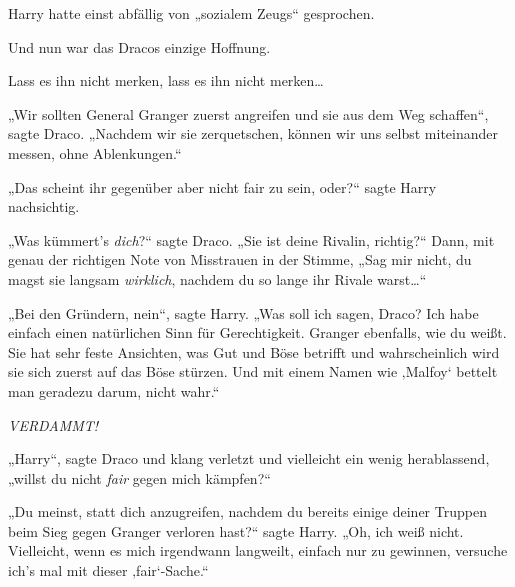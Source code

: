 Harry hatte einst abfällig von „sozialem Zeugs“ gesprochen.

Und nun war das Dracos einzige Hoffnung.

Lass es ihn nicht merken, lass es ihn nicht merken…

„Wir sollten General Granger zuerst angreifen und sie aus dem Weg schaffen“, sagte Draco. „Nachdem wir sie zerquetschen, können wir uns selbst miteinander messen, ohne Ablenkungen.“

„Das scheint ihr gegenüber aber nicht fair zu sein, oder?“ sagte Harry nachsichtig.

„Was kümmert’s \emph{dich}?“ sagte Draco. „Sie ist deine Rivalin, richtig?“ Dann, mit genau der richtigen Note von Misstrauen in der Stimme, „Sag mir nicht, du magst sie langsam \emph{wirklich}, nachdem du so lange ihr Rivale warst…“

„Bei den Gründern, nein“, sagte Harry. „Was soll ich sagen, Draco? Ich habe einfach einen natürlichen Sinn für Gerechtigkeit. Granger ebenfalls, wie du weißt. Sie hat sehr feste Ansichten, was Gut und Böse betrifft und wahrscheinlich wird sie sich zuerst auf das Böse stürzen. Und mit einem Namen wie ‚Malfoy‘ bettelt man geradezu darum, nicht wahr.“

\emph{VERDAMMT!}

„Harry“, sagte Draco und klang verletzt und vielleicht ein wenig herablassend, „willst du nicht \emph{fair} gegen mich kämpfen?“

„Du meinst, statt dich anzugreifen, nachdem du bereits einige deiner Truppen beim Sieg gegen Granger verloren hast?“ sagte Harry. „Oh, ich weiß nicht. Vielleicht, wenn es mich irgendwann langweilt, einfach nur zu gewinnen, versuche ich’s mal mit dieser ‚fair‘-Sache.“

